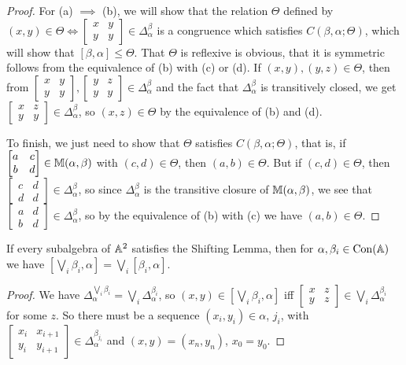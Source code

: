 \begin{appendices}
\begin{proof}
For (a) $\implies$ (b), we will show that the relation $\Theta$ defined by $(x,y) \in \Theta \iff \begin{bmatrix} x & y\\ y & y\end{bmatrix} \in \Delta_{\alpha}^{\beta}$ is a congruence which satisfies $C(\beta,\alpha;\Theta)$, which will show that $[\beta,\alpha] \le \Theta$. That $\Theta$ is reflexive is obvious, that it is symmetric follows from the equivalence of (b) with (c) or (d). If $(x,y), (y,z) \in \Theta$, then from $\begin{bmatrix} x & y\\ y & y\end{bmatrix}, \begin{bmatrix} y & z\\ y & y\end{bmatrix} \in \Delta_{\alpha}^{\beta}$ and the fact that $\Delta_{\alpha}^{\beta}$ is transitively closed, we get $\begin{bmatrix} x & z\\ y & y\end{bmatrix} \in \Delta_{\alpha}^{\beta}$, so $(x,z) \in \Theta$ by the equivalence of (b) and (d).

To finish, we just need to show that $\Theta$ satisfies $C(\beta,\alpha;\Theta)$, that is, if $\begin{bmatrix} a & c\\ b & d\end{bmatrix} \in \mathbb{M}(\alpha,\beta)$ with $(c,d) \in \Theta$, then $(a,b) \in \Theta$. But if $(c,d) \in \Theta$, then $\begin{bmatrix} c & d\\ d & d\end{bmatrix} \in \Delta_{\alpha}^{\beta}$, so since $\Delta_{\alpha}^{\beta}$ is the transitive closure of $\mathbb{M}(\alpha,\beta)$, we see that $\begin{bmatrix} a & d\\ b & d\end{bmatrix} \in \Delta_{\alpha}^{\beta}$, so by the equivalence of (b) with (c) we have $(a,b) \in \Theta$.
\end{proof}

\begin{cor} If every subalgebra of $\mathbb{A}^2$ satisfies the Shifting Lemma, then for $\alpha, \beta_i \in \operatorname{Con}(\mathbb{A})$ we have $[\bigvee_i \beta_i, \alpha] = \bigvee_i[\beta_i,\alpha]$.
\end{cor}
\begin{proof} We have $\Delta_\alpha^{\bigvee_i \beta_i} = \bigvee_i \Delta_\alpha^{\beta_i}$, so $(x,y) \in [\bigvee_i \beta_i, \alpha]$ iff $\begin{bmatrix} x & z\\ y & z\end{bmatrix} \in \bigvee_i \Delta_\alpha^{\beta_i}$ for some $z$. So there must be a sequence $(x_i,y_i) \in \alpha$, $j_i$, with $\begin{bmatrix} x_i & x_{i+1}\\ y_i & y_{i+1}\end{bmatrix} \in \Delta_\alpha^{\beta_{j_i}}$ and $(x,y) = (x_n,y_n)$, $x_0 = y_0$.


\end{proof}
\end{appendices}
